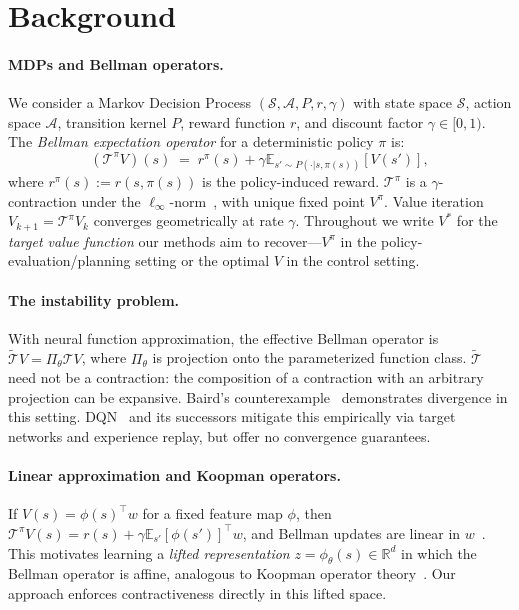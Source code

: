 \documentclass{article}
\newcommand{\R}{\mathbb{R}}
\newcommand{\E}{\mathbb{E}}
\begin{document}
\section{Background}
\label{sec:background}

\paragraph{MDPs and Bellman operators.}
We consider a Markov Decision Process $(\mathcal{S}, \mathcal{A}, P, r, \gamma)$
with state space $\mathcal{S}$, action space $\mathcal{A}$, transition kernel $P$,
reward function $r$, and discount factor $\gamma \in [0,1)$.
The \emph{Bellman expectation operator} for a deterministic policy $\pi$ is:
\begin{equation}
  (\mathcal{T}^\pi V)(s) \;=\; r^\pi(s) + \gamma \E_{s' \sim P(\cdot|s,\pi(s))}[V(s')],
  \label{eq:bellman}
\end{equation}
where $r^\pi(s) := r(s, \pi(s))$ is the policy-induced reward.
$\mathcal{T}^\pi$ is a $\gamma$-contraction under the $\ell_\infty$-norm~\citep{bellman1957dynamic},
with unique fixed point $V^\pi$.
Value iteration $V_{k+1} = \mathcal{T}^\pi V_k$ converges geometrically at rate $\gamma$.
Throughout we write $V^*$ for the \emph{target value function} our methods aim
to recover---$V^\pi$ in the policy-evaluation/planning setting or the optimal
$V$ in the control setting.

\paragraph{The instability problem.}
With neural function approximation, the effective Bellman operator is
$\tilde{\mathcal{T}} V = \Pi_\theta \mathcal{T} V$, where $\Pi_\theta$ is
projection onto the parameterized function class.
$\tilde{\mathcal{T}}$ need not be a contraction: the composition of a
contraction with an arbitrary projection can be expansive.
Baird's counterexample~\citep{baird1995residual} demonstrates divergence in
this setting.
DQN~\citep{mnih2015human} and its successors mitigate this empirically via
target networks and experience replay, but offer no convergence guarantees.

\paragraph{Linear approximation and Koopman operators.}
If $V(s) = \phi(s)^\top w$ for a fixed feature map $\phi$, then
$\mathcal{T}^\pi V(s) = r(s) + \gamma \E_{s'}[\phi(s')]^\top w$, and Bellman
updates are linear in $w$~\citep{tsitsiklis1997analysis}.
This motivates learning a \emph{lifted representation} $z = \phi_\theta(s) \in
\R^d$ in which the Bellman operator is affine, analogous to Koopman operator
theory~\citep{koopman1931hamiltonian,budisic2012applied}.
Our approach enforces contractiveness directly in this lifted space.
\end{document}
